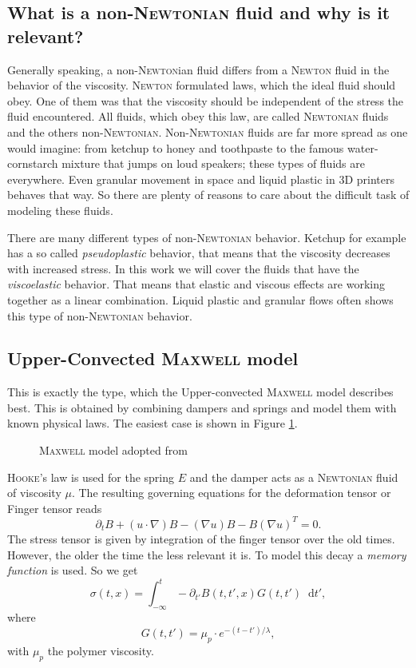 \documentclass[12pt,a4paper,twoside, open=right]{scrreprt}
\theoremstyle{definition}
\theoremstyle{plain}
\newcommand{\D}{\mathop{}\!\mathrm{d}}
\begin{document}
\subsection{What is a non-\textsc{Newtonian} fluid and why is it relevant?}
Generally speaking, a non-\textsc{Newton}ian fluid differs from a \textsc{Newton} fluid in the behavior of the viscosity. \textsc{Newton} formulated laws, which the ideal fluid should obey. One of them was that the viscosity should be independent of the stress the fluid encountered. All fluids, which obey this law, are called \textsc{Newtonian} fluids and the others non-\textsc{Newtonian}. Non-\textsc{Newtonian} fluids are far more spread as one would imagine: from ketchup to honey and toothpaste to the famous water-cornstarch mixture that jumps on loud speakers; these types of fluids are everywhere. Even granular movement in space and liquid plastic in 3D printers behaves that way. So there are plenty of reasons to care about the difficult task of modeling these fluids. \par 
There are many different types of non-\textsc{Newtonian} behavior. Ketchup for example has a so called \emph{pseudoplastic} behavior, that means that the viscosity decreases with increased stress. In this work we will cover the fluids that have the \emph{viscoelastic }behavior. That means that elastic and viscous effects are working together as a linear combination. Liquid plastic and granular flows often shows this type of non-\textsc{Newtonian} behavior.
\subsection{Upper-Convected \textsc{Maxwell} model}
This is exactly the type, which the Upper-convected \textsc{Maxwell} model describes best. This is obtained by combining dampers and springs and model them with known physical laws. The easiest case is shown in Figure \ref{fig:maxwell}.
\begin{figure}
    \centering
    
    \def\svgwidth{0.5\textwidth}
    
    \caption[\textsc{Maxwell} model]{\textsc{Maxwell} model adopted from \cite{Pekaje}}
    \label{fig:maxwell}
    
\end{figure}
\textsc{Hooke}'s law is used for the spring $E$ and the damper acts as a \textsc{Newtonian} fluid of viscosity $\mu$. 
The resulting governing equations for the deformation tensor or Finger tensor reads
\begin{equation}
    \partial_t B + (u\cdot\nabla)B-(\nabla u)B-B(\nabla u)^T =0.
\end{equation}
The stress tensor is given by integration of the finger tensor over the old times. However, the older the time the less relevant it is. To model this decay a \emph{memory function} is used. So we get
\begin{equation}
     \sigma(t,x) = \int_{-\infty}^t-\partial_{t'}B(t,t',x)G(t,t')\D t',
\end{equation}
where 
\begin{equation}
    G(t,t')=\mu_p\cdot e^{-(t-t')/\lambda},
\end{equation}
with $\mu_p$ the polymer viscosity.
\end{document}
